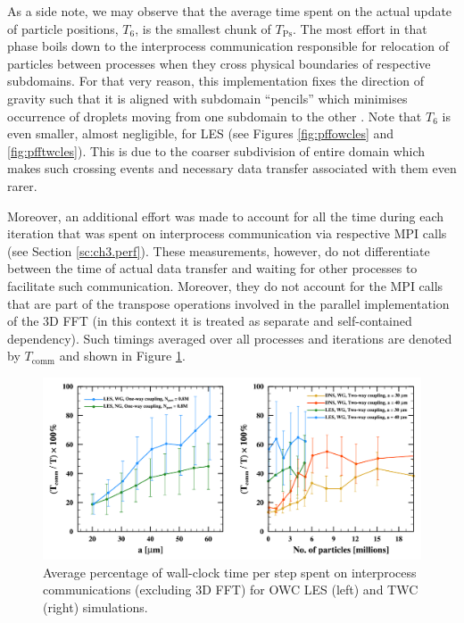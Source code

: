 \documentclass{pracamgren}
\begin{document}
As a side note, we may observe that the average time spent on the actual update of particle positions, $T_6$, is the smallest chunk of $T_{\text{Ps}}$.
The most effort in that phase boils down to the interprocess communication responsible for relocation of particles between processes when they cross physical boundaries of respective subdomains.
For that very reason, this implementation fixes the direction of gravity such that it is aligned with subdomain ``pencils'' which minimises occurrence of droplets moving from one subdomain to the other \parencite{Ayala2014}.
Note that $T_6$ is even smaller, almost negligible, for LES (see Figures \ref{fig:pffowcles} and \ref{fig:pfftwcles}).
This is due to the coarser subdivision of entire domain which makes such crossing events and necessary data transfer associated with them even rarer.

\medskip

Moreover, an additional effort was made to account for all the time during each iteration that was spent on interprocess communication via respective MPI calls (see Section \ref{sc:ch3.perf}).
These measurements, however, do not differentiate between the time of actual data transfer and waiting for other processes to facilitate such communication.
Moreover, they do not account for the MPI calls that are part of the transpose operations involved in the parallel implementation of the 3D FFT (in this context it is treated as separate and self-contained dependency).
Such timings averaged over all processes and iterations are denoted by $T_{\text{comm}}$ and shown in Figure \ref{fig:pffcomm}.

\begin{figure}[ht]
\centering
\includegraphics[width=13.5cm]{figures/3-12_pffcomm.pdf}
\caption{
Average percentage of wall-clock time per step spent on interprocess communications (excluding 3D FFT) for OWC LES (left) and TWC (right) simulations.
}
\label{fig:pffcomm}
\end{figure}
\end{document}
